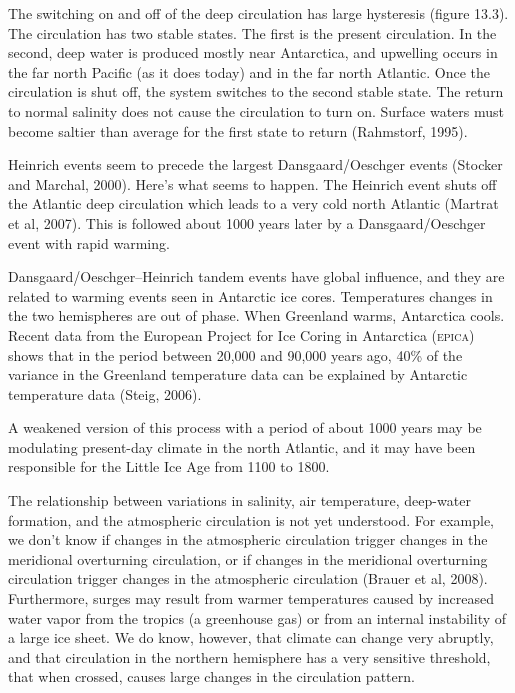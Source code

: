 \begin{enumerate}
\vitem The switching on and off of the deep circulation has large
hysteresis (figure 13.3). The circulation has two stable states. The
first is the present circulation. In the second, deep water is
produced mostly near Antarctica, and upwelling occurs in the far north Pacific (as it does today)
and in the far north Atlantic. Once the circulation is shut off, the
system switches to the second stable state. The return to normal
salinity does not cause the circulation to turn on. Surface waters
must become saltier than average for the first state to return
(Rahmstorf, 1995).

\vitem Heinrich events seem to precede the largest Dansgaard/Oeschger
events (Stocker and Marchal, 2000). Here's what seems to happen. The
Heinrich event shuts off the Atlantic deep circulation which leads to
a very cold north Atlantic (Martrat et al, 2007). This is followed
about 1000 years later by a Dansgaard/Oeschger event with rapid
warming.

\vitem Dansgaard/Oeschger--Heinrich tandem events have global
influence, and they are related to warming events seen in Antarctic
ice cores. Temperatures changes in the two hemispheres are out of
phase. When Greenland warms, Antarctica cools. Recent data from the
European Project for Ice Coring in Antarctica (\textsc{epica}) shows
that in the period between 20,000 and 90,000 years ago, 40\% of the
variance in the Greenland temperature data can be explained by
Antarctic temperature data (Steig, 2006).

\vitem A weakened version of this process with a period of about 1000
years may be modulating present-day climate in the north Atlantic, and
it may have been responsible for the Little Ice Age from 1100 to 1800.
\end{enumerate}

The relationship between variations in salinity, air temperature,
deep-water formation, and the atmospheric circulation is not yet
understood. For example, we don't know if changes in the atmospheric
circulation trigger changes in the meridional overturning circulation,
or if changes in the meridional overturning circulation trigger
changes in the atmospheric circulation (Brauer et al,
2008). Furthermore, surges may result from warmer temperatures caused
by increased water vapor from the tropics (a greenhouse gas) or from
an internal instability of a large ice sheet. We do know, however,
that climate can change very abruptly, and that circulation in the
northern hemisphere has a very sensitive threshold, that when crossed,
causes large changes in the circulation pattern.

